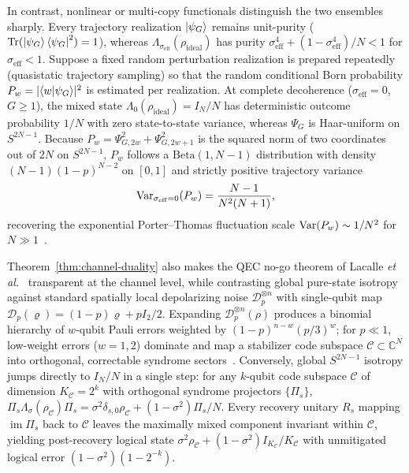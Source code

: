 In contrast, nonlinear or multi-copy functionals distinguish the two ensembles sharply. Every trajectory realization $\ket{\psi_G}$ remains unit-purity ($\operatorname{Tr}(\ket{\psi_G}\bra{\psi_G}^2) = 1$), whereas $\Lambda_{\sigma_{\mathrm{eff}}}(\rho_{\mathrm{ideal}})$ has purity $\sigma_{\mathrm{eff}}^4 + (1 - \sigma_{\mathrm{eff}}^4)/N < 1$ for $\sigma_{\mathrm{eff}} < 1$. Suppose a fixed random perturbation realization is prepared repeatedly (quasistatic trajectory sampling) so that the random conditional Born probability $P_w = \lvert\braket{w | \psi_G}\rvert^2$ is estimated per realization. At complete decoherence ($\sigma_{\mathrm{eff}} = 0$, $G \ge 1$), the mixed state $\Lambda_0(\rho_{\mathrm{ideal}}) = I_N/N$ has deterministic outcome probability $1/N$ with zero state-to-state variance, whereas $\Psi_G$ is Haar-uniform on $S^{2N-1}$. Because $P_w = \Psi_{G,2w}^2 + \Psi_{G,2w+1}^2$ is the squared norm of two coordinates out of $2N$ on $S^{2N-1}$, $P_w$ follows a $\mathrm{Beta}(1, N - 1)$ distribution with density $(N - 1)(1 - p)^{N-2}$ on $[0, 1]$ and strictly positive trajectory variance
\begin{equation}
\operatorname{Var}_{\sigma_{\mathrm{eff}}=0}(P_w) = \frac{N - 1}{N^2(N + 1)},
\label{eq:porter-thomas}
\end{equation}
recovering the exponential Porter--Thomas fluctuation scale $\operatorname{Var}(P_w) \sim 1/N^2$ for $N \gg 1$~\cite{Boixo2018}.

Theorem~\ref{thm:channel-duality} also makes the QEC no-go theorem of Lacalle \emph{et al.}~\cite{Lacalle2021} transparent at the channel level, while contrasting global pure-state isotropy against standard spatially local depolarizing noise $\mathcal{D}_p^{\otimes n}$ with single-qubit map $\mathcal{D}_p(\varrho) = (1 - p)\varrho + p I_2/2$. Expanding $\mathcal{D}_p^{\otimes n}(\rho)$ produces a binomial hierarchy of $w$-qubit Pauli errors weighted by $(1 - p)^{n-w}(p/3)^w$; for $p \ll 1$, low-weight errors ($w = 1, 2$) dominate and map a stabilizer code subspace $\mathcal{C} \subset \mathbb{C}^N$ into orthogonal, correctable syndrome sectors~\cite{NielsenChuang2010,Fowler2012}. Conversely, global $S^{2N-1}$ isotropy jumps directly to $I_N/N$ in a single step: for any $k$-qubit code subspace $\mathcal{C}$ of dimension $K_{\mathcal{C}} = 2^k$ with orthogonal syndrome projectors $\{\Pi_s\}$, $\Pi_s \Lambda_\sigma(\rho_{\mathcal{C}})\Pi_s = \sigma^2 \delta_{s,0}\rho_{\mathcal{C}} + (1 - \sigma^2)\Pi_s/N$. Every recovery unitary $R_s$ mapping $\operatorname{im}\Pi_s$ back to $\mathcal{C}$ leaves the maximally mixed component invariant within $\mathcal{C}$, yielding post-recovery logical state $\sigma^2\rho_{\mathcal{C}} + (1 - \sigma^2)I_{K_{\mathcal{C}}}/K_{\mathcal{C}}$ with unmitigated logical error $(1 - \sigma^2)(1 - 2^{-k})$.

